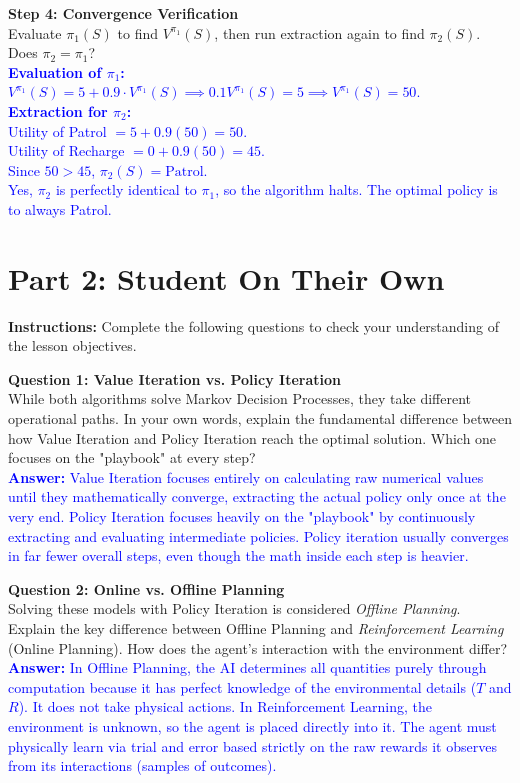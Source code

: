 \documentclass[12pt]{article}
\begin{document}
\noindent \textbf{Step 4: Convergence Verification}\\
Evaluate $\pi_1(S)$ to find $V^{\pi_1}(S)$, then run extraction again to find $\pi_2(S)$. \\
Does $\pi_2 = \pi_1$?\\
\textcolor{blue}{\textbf{Evaluation of $\pi_1$:} \\
$V^{\pi_1}(S) = 5 + 0.9 \cdot V^{\pi_1}(S) \implies 0.1 V^{\pi_1}(S) = 5 \implies V^{\pi_1}(S) = 50$.\\
\textbf{Extraction for $\pi_2$:} \\
Utility of Patrol $= 5 + 0.9(50) = 50$. \\
Utility of Recharge $= 0 + 0.9(50) = 45$. \\
Since $50 > 45$, $\pi_2(S) = \text{Patrol}$. \\
Yes, $\pi_2$ is perfectly identical to $\pi_1$, so the algorithm halts. The optimal policy is to always Patrol.}
\vspace{0.5cm}

\newpage
\section*{Part 2: Student On Their Own}
\textbf{Instructions:} Complete the following questions to check your understanding of the lesson objectives.

\vspace{0.5cm}
\noindent \textbf{Question 1: Value Iteration vs. Policy Iteration} \\
While both algorithms solve Markov Decision Processes, they take different operational paths. In your own words, explain the fundamental difference between how Value Iteration and Policy Iteration reach the optimal solution. Which one focuses on the "playbook" at every step?\\
\textcolor{blue}{\textbf{Answer:} Value Iteration focuses entirely on calculating raw numerical values until they mathematically converge, extracting the actual policy only once at the very end. Policy Iteration focuses heavily on the "playbook" by continuously extracting and evaluating intermediate policies. Policy iteration usually converges in far fewer overall steps, even though the math inside each step is heavier.}
\vspace{0.5cm}

\noindent \textbf{Question 2: Online vs. Offline Planning} \\
Solving these models with Policy Iteration is considered \textit{Offline Planning}. Explain the key difference between Offline Planning and \textit{Reinforcement Learning} (Online Planning). How does the agent's interaction with the environment differ?\\
\textcolor{blue}{\textbf{Answer:} In Offline Planning, the AI determines all quantities purely through computation because it has perfect knowledge of the environmental details ($T$ and $R$). It does not take physical actions. In Reinforcement Learning, the environment is unknown, so the agent is placed directly into it. The agent must physically learn via trial and error based strictly on the raw rewards it observes from its interactions (samples of outcomes).}
\vspace{0.5cm}
\end{document}
